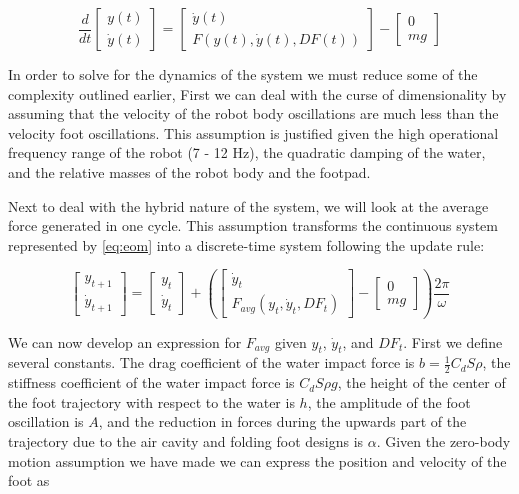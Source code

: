 \begin{equation}
	\frac{d}{dt} \begin{bmatrix} y(t) \\ \dot{y}(t) \end{bmatrix} = \begin{bmatrix} \dot{y}(t) \\ F(y(t),\dot{y}(t), DF(t)) \end{bmatrix} - \begin{bmatrix} 0 \\ mg \end{bmatrix}
	\label{eq:eom}
\end{equation}

In order to solve for the dynamics of the system we must reduce some of the complexity outlined earlier, First we can deal with the curse of dimensionality by assuming that the velocity of the robot body oscillations are much less than the velocity foot oscillations. This assumption is justified given the high operational frequency range of the robot (7 - 12 Hz), the quadratic damping of the water, and the relative masses of the robot body and the footpad.
	
Next to deal with the hybrid nature of the system, we will look at the average force generated in one cycle. This assumption transforms the continuous system represented by \ref{eq:eom} into a discrete-time system following the update rule:

\begin{equation}
	\begin{bmatrix} y_{t+1} \\ \dot{y}_{t+1} \end{bmatrix} = \begin{bmatrix} y_{t} \\ \dot{y}_{t} \end{bmatrix} + \left( \begin{bmatrix}  \dot{y}_t \\ F_{avg}(y_t,\dot{y}_t, DF_t) \end{bmatrix} - \begin{bmatrix} 0 \\ mg  \end{bmatrix} \right) \frac{2 \pi}{\omega}
	\label{eq:eom_discrete}
\end{equation}

We can now develop an expression for $F_{avg}$ given $y_t$, $\dot{y}_t$, and $DF_t$. First we define several constants. The drag coefficient of the water impact force is $b = \frac{1}{2} C_d S \rho$, the stiffness coefficient of the water impact force is $C_d S \rho g$, the height of the center of the foot trajectory with respect to the water is $h$, the amplitude of the foot oscillation is $A$, and the reduction in forces during the upwards part of the trajectory due to the air cavity and folding foot designs is $\alpha$. Given the zero-body motion assumption we have made we can express the position and velocity of the foot as

